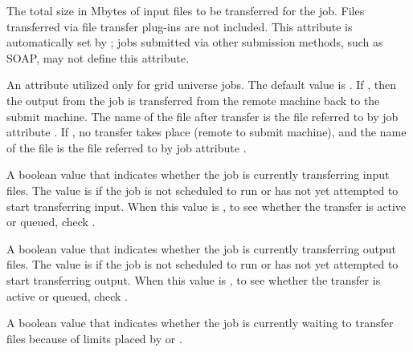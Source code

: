\begin{description}
\item[\AdAttr{TransferInputSizeMB}:]
The total size in Mbytes of input files to be transferred for the
job.  Files transferred via file transfer plug-ins are not included.
This attribute is automatically set by ; jobs submitted
via other submission methods, such as SOAP, may not define this
attribute.

\item[\AdAttr{TransferOut}:]   
An attribute utilized only for grid universe jobs.
The default value is .
If , then the output from the job
is transferred from the remote machine back to the submit machine.
The name of the file after transfer is the file referred to
by job attribute .
If , no transfer takes place (remote to submit machine),
and the name of the file is the file referred to
by job attribute .

\item[\AdAttr{TransferringInput}:]
A boolean value that indicates whether the job is currently
transferring input files.  The value is  if the job is
not scheduled to run or has not yet attempted to start transferring
input.  When this value is , to see whether the transfer is
active or queued, check .

\item[\AdAttr{TransferringOutput}:]
A boolean value that indicates whether the job is currently
transferring output files.  The value is  if the job
is not scheduled to run or has not yet attempted to start transferring
output.  When this value is , to see whether the transfer
is active or queued, check .

\item[\AdAttr{TransferQueued}:]

A boolean value that indicates whether the job is currently waiting to
transfer files because of limits placed by
 or
.


\end{description}

